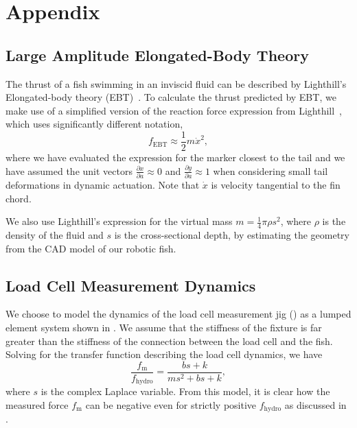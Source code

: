 \section{Appendix}

\subsection{Large Amplitude Elongated-Body Theory}
\label{sec:large_amplitude_ebt}
The thrust of a fish swimming in an inviscid fluid can be described by Lighthill's Elongated-body theory (EBT)~\cite{lighthill1971large}. To calculate the thrust predicted by EBT, we make use of a simplified version of the reaction force expression from Lighthill~\cite{lighthill1971large}, which uses significantly different notation,
\begin{equation}
    f_\textrm{EBT} \approx \frac{1}{2}m\dot{x}^2,
\end{equation}
where we have evaluated the expression for the marker closest to the tail and we have assumed the unit vectors $\frac{\partial x}{\partial a}\approx 0$ and $\frac{\partial y}{\partial a} \approx 1$ when considering small tail deformations in dynamic actuation. Note that $\dot{x}$ is velocity tangential to the fin chord.

We also use Lighthill's expression for the virtual mass $m=\frac{1}{4} \pi \rho s^2$, where $\rho$ is the density of the fluid and $s$ is the cross-sectional depth, by estimating the geometry from the CAD model of our robotic fish.




\subsection{Load Cell Measurement Dynamics}
\label{sec:load_cell_measurement}

We choose to model the dynamics of the load cell measurement jig () as a lumped element system shown in . We assume that the stiffness of the fixture is far greater than the stiffness of the connection between the load cell and the fish. 
Solving for the transfer function describing the load cell dynamics, we have
\begin{equation}
    \frac{f_\textrm{m}}{f_\textrm{hydro}} = \frac{bs+k}{ms^2+bs+k},
    \label{eqn:measurement_dynamics}
\end{equation}
where $s$ is the complex Laplace variable. From this model, it is clear how the measured force $f_\textrm{m}$ can be negative even for strictly positive $f_\textrm{hydro}$ as discussed in . 

